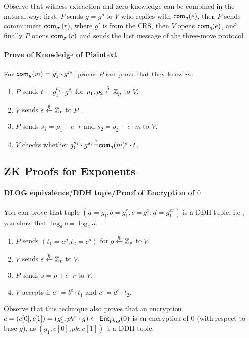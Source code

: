 Observe that witness extraction and zero knowledge can be combined in
the natural way: first, $P$ sends $g=g^\rho$ to $V$ who replies with
$\mathsf{com}_g(e)$, then $P$ sends commitment $\mathsf{com}_{g'}(r)$, where $g'$ is
from the CRS, then $V$ opens $\mathsf{com}_g(e)$, and finally $P$ opens
$\mathsf{com}_{g'}(r)$ and sends the last message of the three-move protocol.

\paragraph{Prove of Knowledge of Plaintext}
For $\mathsf{com}_{g}(m)=g_1^r\cdot{}g^m$,  prover $P$ can prove that they know
$m$.

\begin{enumerate}
\item $P$ sends $t=g_1^{\rho_1}\cdot{}g^{\rho_2}$ for
  $\rho_1,\rho_2\stackrel{\$}{\leftarrow}\mathbb{Z}_p$ to $V$.
\item $V$ sends $e\stackrel{\$}{\leftarrow}\mathbb{Z}_p$ to $P$.
  \item $P$ sends $s_1=\rho_1+e\cdot{}r$ and $s_2=\rho_2+e\cdot{}m$ to
    $V$.
    \item $V$ checks whether $g_1^{s_1}\cdot{}g^{s_2}{\stackrel{?}{=}}\mathsf{com}_{g}(m)^e\cdot{}t$.
\end{enumerate}


\subsection{ZK Proofs for Exponents}
\paragraph{DLOG equivalence/DDH tuple/Proof of Encryption of $0$}
You can prove that tuple $(a=g_1,b=g_1^r,c=g_1^x,d=g_1^{xr})$ is a DDH
tuple, i.e., you show that $\log_{a}{b}=\log_c{d}$.

\begin{enumerate}
\item $P$ sends $(t_1=a^{\rho},t_2=c^{\rho})$ for $\rho\stackrel{\$}{\leftarrow}\mathbb{Z}_p$ to $V$.
  \item $V$ sends $e\stackrel{\$}{\leftarrow}\mathbb{Z}_p$ to $V$.
  \item $P$ sends $s=\rho+e\cdot{}r$ to $V$.
    \item $V$ accepts if $a^s=b^e\cdot{}t_1$ and $c^s=d^e\cdot{}t_2$.
\end{enumerate}

Observe that this technique also proves that an encryption
$c=(c[0],c[1])=(g_1^r,pk^r\cdot{}g)\leftarrow{\mathsf{Enc}}_{pk,g}(0)$ is an
encryption of $0$ (with respect to base $g$), as $(g_1,c[0],pk,c[1])$
is a DDH tuple.

